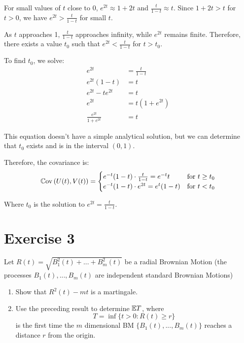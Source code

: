 \documentclass[12pt]{article}
\begin{document}
\begin{enumerate}
		For small values of $t$ close to 0, $e^{2t} \approx 1 + 2t$ and $\frac{t}{1-t} \approx t$. Since $1 + 2t > t$ for $t > 0$, we have $e^{2t} > \frac{t}{1-t}$ for small $t$.
		
		As $t$ approaches 1, $\frac{t}{1-t}$ approaches infinity, while $e^{2t}$ remains finite. Therefore, there exists a value $t_0$ such that $e^{2t} < \frac{t}{1-t}$ for $t > t_0$.
		
		To find $t_0$, we solve:
		\begin{align*}
			e^{2t} &= \frac{t}{1-t} \\
			e^{2t}(1-t) &= t \\
			e^{2t} - te^{2t} &= t \\
			e^{2t} &= t(1 + e^{2t}) \\
			\frac{e^{2t}}{1 + e^{2t}} &= t
		\end{align*}
		
		This equation doesn't have a simple analytical solution, but we can determine that $t_0$ exists and is in the interval $(0, 1)$.
		
		Therefore, the covariance is:
		\begin{equation*}
			\mathbb{C}\mathrm{ov}\,(U(t), V(t)) = 
			\begin{cases}
				e^{-t}(1-t) \cdot \frac{t}{1-t} = e^{-t}t & \text{for } t \geq t_0 \\
				e^{-t}(1-t) \cdot e^{2t} = e^{t}(1-t) & \text{for } t < t_0
			\end{cases}
		\end{equation*}
		
		Where $t_0$ is the solution to $e^{2t} = \frac{t}{1-t}$.
	\end{enumerate}
	\section*{Exercise 3}
	Let $R(t) = \sqrt{B_1^2(t) + ... +B_m^2(t)}$ be a radial Brownian Motion (the processes $B_1(t), ..., B_m(t)$ are independent standard Brownian Motions)
	\begin{enumerate}
		\item Show that $R^2(t) - mt$ is a martingale.
		\item Use the preceding result to determine $\mathbb{E}{T}$, where 
		\begin{equation*}
			T = \inf\{t > 0 : R(t) \geq r\}
		\end{equation*}
		is the first time the $m$ dimensional BM $\{B_1(t), ..., B_m(t)\}$ reaches a distance $r$ from the origin.
	\end{enumerate}
	
\end{document}
